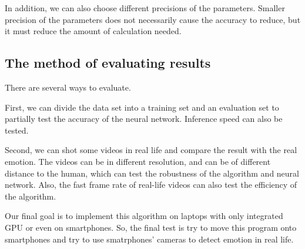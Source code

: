 In addition, we can also choose different precisions of the parameters. Smaller precision of the parameters does not necessarily cause the accuracy to reduce, but it must reduce the amount of calculation needed.

\subsection{The method of evaluating results}
There are several ways to evaluate. 

First, we can divide the data set into a training set and an evaluation set to partially test the accuracy of the neural network. Inference speed can also be tested.

Second, we can shot some videos in real life and compare the result with the real emotion. The videos can be in different resolution, and can be of different distance to the human, which can test the robustness of the algorithm and neural network. Also, the fast frame rate of real-life videos can also test the efficiency of the algorithm.

Our final goal is to implement this algorithm on laptops with only integrated GPU or even on smartphones. So, the final test is try to move this program onto smartphones and try to use smatrphones' cameras to detect emotion in real life.

